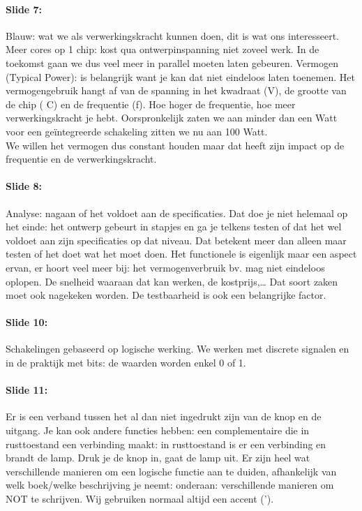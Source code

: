 \documentclass[10pt,a4paper]{book}
\begin{document}
\paragraph{Slide 7:} Blauw: wat we als verwerkingskracht kunnen doen, dit is wat ons interesseert. Meer cores op 1 chip: kost qua ontwerpinspanning niet zoveel werk. In de toekomst gaan we dus veel meer in parallel moeten laten gebeuren. Vermogen (Typical Power): is belangrijk want je kan dat niet eindeloos laten toenemen. Het vermogengebruik hangt af van de spanning in het kwadraat (V), de grootte van de chip ( C) en de frequentie (f). Hoe hoger de frequentie, hoe meer verwerkingskracht je hebt. Oorspronkelijk zaten we aan minder dan een Watt voor een ge\"integreerde schakeling zitten we nu aan 100 Watt. \\
We willen het vermogen dus constant houden maar dat heeft zijn impact op de frequentie en de verwerkingskracht. 

\paragraph{Slide 8:} Analyse: nagaan of het voldoet aan de specificaties. Dat doe je niet helemaal op het einde: het ontwerp gebeurt in stapjes en ga je telkens testen of dat het wel voldoet aan zijn specificaties op dat niveau. Dat betekent meer dan alleen maar testen of het doet wat het moet doen. Het functionele is eigenlijk maar een aspect ervan, er hoort veel meer bij: het vermogenverbruik bv. mag niet eindeloos oplopen. De snelheid waaraan dat kan werken, de kostprijs,… Dat soort zaken moet ook nagekeken worden. De testbaarheid is ook een belangrijke factor.

\paragraph{Slide 10:} Schakelingen gebaseerd op logische werking. We werken met discrete signalen en in de praktijk met bits: de waarden worden enkel 0 of 1. 

\paragraph{Slide 11:} Er is een verband tussen het al dan niet ingedrukt zijn van de knop en de uitgang. Je kan ook andere functies hebben: een complementaire die in rusttoestand een verbinding maakt: in rusttoestand is er een verbinding en brandt de lamp. Druk je de knop in, gaat de lamp uit. Er zijn heel wat verschillende manieren om een logische functie aan te duiden, afhankelijk van welk boek/welke beschrijving je neemt: onderaan: verschillende manieren om NOT te schrijven. Wij gebruiken normaal altijd een accent (').
\end{document}
